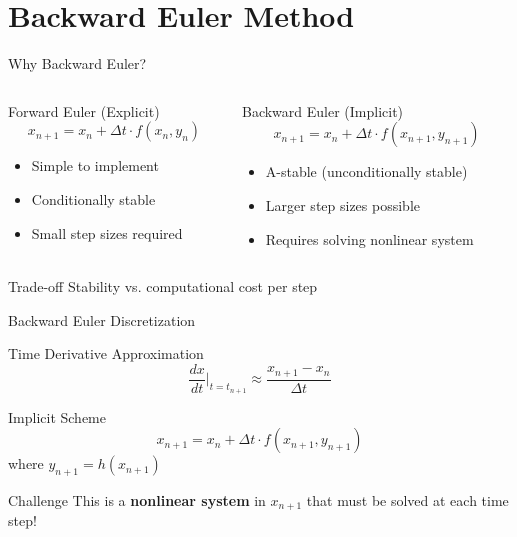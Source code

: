 \documentclass[10pt]{beamer}
\begin{document}
\section{Backward Euler Method}

\begin{frame}{Why Backward Euler?}
\begin{columns}
\begin{column}{0.5\textwidth}
\begin{block}{Forward Euler (Explicit)}
\begin{equation}
x_{n+1} = x_n + \Delta t \cdot f(x_n, y_n)
\end{equation}
\end{block}
\begin{itemize}
\item Simple to implement
\item Conditionally stable
\item Small step sizes required
\end{itemize}
\end{column}

\begin{column}{0.5\textwidth}
\begin{block}{Backward Euler (Implicit)}
\begin{equation}
x_{n+1} = x_n + \Delta t \cdot f(x_{n+1}, y_{n+1})
\end{equation}
\end{block}
\begin{itemize}
\item A-stable (unconditionally stable)
\item Larger step sizes possible
\item Requires solving nonlinear system
\end{itemize}
\end{column}
\end{columns}

\pause
\begin{alertblock}{Trade-off}
Stability vs. computational cost per step
\end{alertblock}
\end{frame}

\begin{frame}{Backward Euler Discretization}
\begin{block}{Time Derivative Approximation}
\begin{equation}
\frac{dx}{dt}\bigg|_{t=t_{n+1}} \approx \frac{x_{n+1} - x_n}{\Delta t}
\end{equation}
\end{block}

\begin{block}{Implicit Scheme}
\begin{equation}
x_{n+1} = x_n + \Delta t \cdot f(x_{n+1}, y_{n+1})
\end{equation}
where $y_{n+1} = h(x_{n+1})$
\end{block}

\pause
\begin{alertblock}{Challenge}
This is a \textbf{nonlinear system} in $x_{n+1}$ that must be solved at each time step!
\end{alertblock}
\end{frame}
\end{document}
